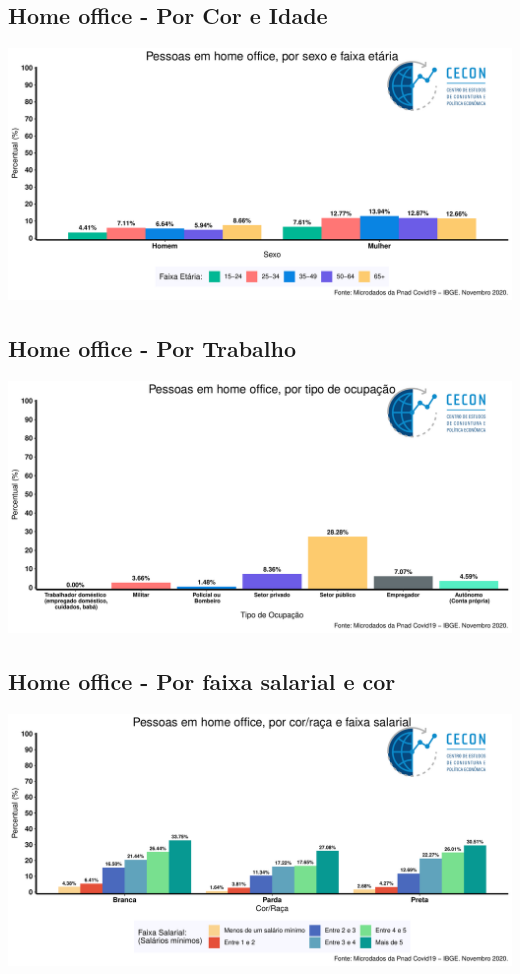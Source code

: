 \documentclass{SelfArx}
\begin{document}
\subsection*{Home office - Por Cor e Idade}
\label{sec:org41fe8be}
\begin{center}
\includegraphics[width=.9\linewidth]{./figs/PNAD_COVID/home_sexo_idade.pdf}
\end{center}

\subsection*{Home office - Por Trabalho}
\label{sec:org0157a7c}
\begin{center}
\includegraphics[width=.9\linewidth]{./figs/PNAD_COVID/home_emprego.pdf}
\end{center}

\subsection*{Home office - Por faixa salarial e cor}
\label{sec:orgd2f1848}
\begin{center}
\includegraphics[width=.9\linewidth]{./figs/PNAD_COVID/home_renda.pdf}
\end{center}
\end{document}
